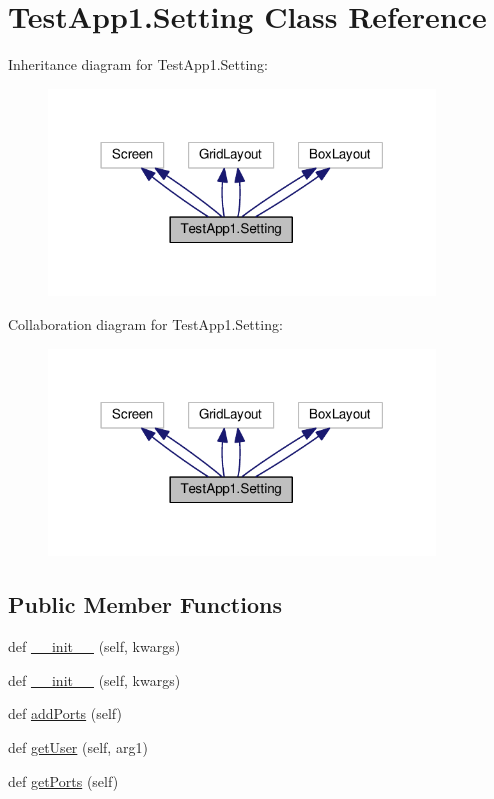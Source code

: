 \hypertarget{classTestApp1_1_1Setting}{}\section{Test\+App1.\+Setting Class Reference}
\label{classTestApp1_1_1Setting}


Inheritance diagram for Test\+App1.\+Setting\+:\nopagebreak
\begin{figure}[H]
\begin{center}
\leavevmode
\includegraphics[width=291pt]{classTestApp1_1_1Setting__inherit__graph}
\end{center}
\end{figure}


Collaboration diagram for Test\+App1.\+Setting\+:\nopagebreak
\begin{figure}[H]
\begin{center}
\leavevmode
\includegraphics[width=291pt]{classTestApp1_1_1Setting__coll__graph}
\end{center}
\end{figure}
\subsection*{Public Member Functions}
\begin{DoxyCompactItemize}
\item 
def \hyperlink{classTestApp1_1_1Setting_a74bad58507816fbeaff1fc4179897de7}{\+\_\+\+\_\+init\+\_\+\+\_\+} (self, kwargs)
\item 
def \hyperlink{classTestApp1_1_1Setting_a74bad58507816fbeaff1fc4179897de7}{\+\_\+\+\_\+init\+\_\+\+\_\+} (self, kwargs)
\item 
def \hyperlink{classTestApp1_1_1Setting_a93ff4a112c0ea2d7fbb741294fbe84e4}{add\+Ports} (self)
\item 
def \hyperlink{classTestApp1_1_1Setting_af372ec2bb98248f237bc11e3b789966f}{get\+User} (self, arg1)
\item 
def \hyperlink{classTestApp1_1_1Setting_ace2d3903967a735e697a106e65e91ef9}{get\+Ports} (self)
\end{DoxyCompactItemize}

